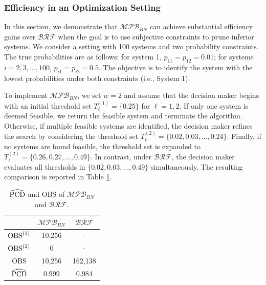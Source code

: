 \documentclass[11pt]{article}
\begin{document}
\subsubsection{Efficiency in an Optimization Setting} 
\label{subsubsec:HeuristicEfficiency}


In this section, we demonstrate that $\mathcal{MPB}_{BN}$ can achieve substantial efficiency gains over $\mathcal{BRF}$ when the goal is to use subjective constraints to prune inferior systems. 
We consider a setting with 100 systems and two probability constraints. The true probabilities are as follows: for system 1, $p_{11} = p_{12} = 0.01$; for systems $i=2, 3, \ldots, 100$, $p_{i1} = p_{i2} = 0.5$. The objective is to identify the system with the lowest probabilities under both constraints (i.e., System 1).

To implement $\mathcal{MPB}_{BN}$, we set $w=2$ and assume that the decision maker begins with an initial threshold set $T_\ell^{(1)}=\{0.25\}$ for $\ell=1,2$. If only one system is deemed feasible, we return the feasible system and terminate the algorithm. Otherwise, if multiple feasible systems are identified, the decision maker refines the search by considering the threshold set $T_\ell^{(2)}=\{0.02,0.03, \ldots ,0.24\}$. Finally, if no systems are found feasible, the threshold set is expanded to $T_\ell^{(2)}=\{0.26, 0.27, \ldots, 0.49\}$. In contrast, under $\mathcal{BRF}$, the decision maker evaluates all thresholds in $\{0.02, 0.03, \ldots, 0.49\}$ simultaneously. 
The resulting comparison is reported in Table \ref{tab:largesavings}.

\begin{table}[h!] 
\centering
\setlength{\tabcolsep}{10pt}
\renewcommand{\arraystretch}{0.9}
\caption{$\widehat{{\rm PCD}}$ and OBS of $\mathcal{MPB}_{BN}$ and $\mathcal{BRF}$.}
\label{tab:largesavings}
{\normalsize
\begin{tabular}{ccc}
\toprule
    & $\mathcal{MPB}_{BN}$     & $\mathcal{BRF}$      \\ \midrule
    ${\rm OBS}^{(1)}$ & 10,256 & - \\  
    ${\rm OBS}^{(2)}$ & 0 & - \\  \hline
    OBS & 10,256 & 162,138 \\  \hline
    $\widehat{{\rm PCD}}$ & 0.999         & 0.984     \\ \bottomrule
\end{tabular}
}
\end{table}
\end{document}
